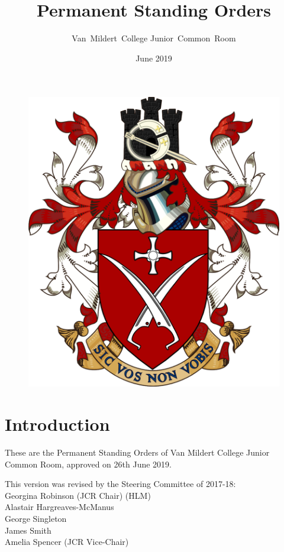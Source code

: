 \documentclass[12pt]{article}  %
\title{Permanent Standing Orders}
\author{Van~Mildert~College Junior~Common~Room}
\date{June 2019}
\begin{document}
\begin{titlepage}  %
    \maketitle
    \begin{figure}[h]
    \includegraphics[scale=0.25]{arms}  %
    \centering
    \end{figure}
    \thispagestyle{empty}
\end{titlepage}

\setcounter{page}{2}  %
\section*{Introduction}
These are the Permanent Standing Orders of Van Mildert College Junior Common Room, approved on 26th June 2019.

This version was revised by the Steering Committee of 2017-18:\\
\hspace*{2cm}Georgina Robinson (JCR Chair) (HLM)\\
\hspace*{2cm}Alastair Hargreaves-McManus\\
\hspace*{2cm}George Singleton\\
\hspace*{2cm}James Smith\\
\hspace*{2cm}Amelia Spencer (JCR Vice-Chair)
\end{document}
